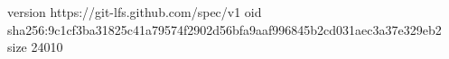 version https://git-lfs.github.com/spec/v1
oid sha256:9c1cf3ba31825c41a79574f2902d56bfa9aaf996845b2cd031aec3a37e329eb2
size 24010
